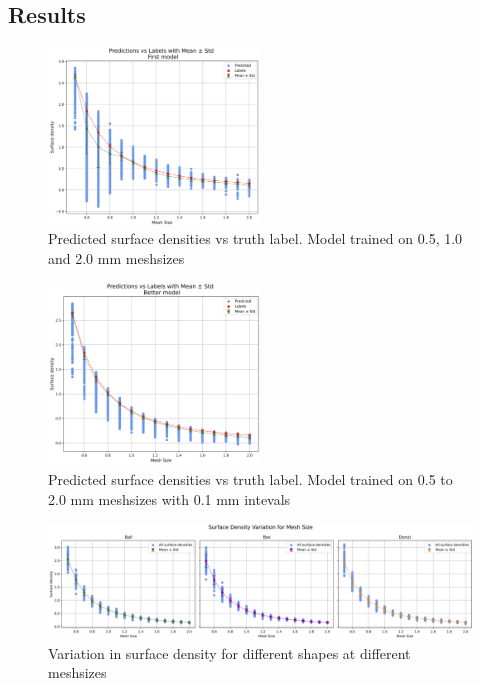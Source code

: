 \subsection{Results}

\begin{figure}[H]
    \centering
    \includegraphics[width=0.5\textwidth]{figures/predict_vs_label_first_lowQ.png}
    \caption{Predicted surface densities vs truth label. Model trained on 0.5, 1.0 and 2.0 mm meshsizes}\label{fig:pred_vs_label_first}
\end{figure}

\begin{figure}[H]
    \centering
    \includegraphics[width=0.5\textwidth]{figures/predict_vs_label_better_lowQ.png}
    \caption{Predicted surface densities vs truth label. Model trained on 0.5 to 2.0 mm meshsizes with 0.1 mm intevals}
    \label{fig:pred_vs_label_better}
\end{figure}

\begin{figure}[t]
    \centering
    \includegraphics[width=\textwidth]{figures/sd_vs_mesh_lowQ.png}
    \caption{Variation in surface density for different shapes at different meshsizes}
    \label{fig:sd_mesh}
\end{figure}

